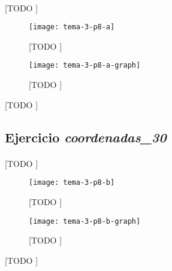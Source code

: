 \documentclass[spanish]{article}
\begin{document}
			\paragraph{}
			[TODO ]

			\begin{figure}[h]
				\begin{center}
					\texttt{[image: tema-3-p8-a]}
				\end{center}
				\caption{[TODO ]}
				\label{}
			\end{figure}

			\begin{figure}[h]
				\begin{center}
					\texttt{[image: tema-3-p8-a-graph]}
				\end{center}
				\caption{[TODO ]}
				\label{}
			\end{figure}

			\begin{table}[h]
				\begin{center}
				\end{center}
				\caption{[TODO ]}
				\label{}
			\end{table}


		\subsection{Ejercicio \emph{coordenadas\_30}}
		\label{sec:e-8b}

			\paragraph{}
			[TODO ]

			\begin{figure}[h]
				\begin{center}
					\texttt{[image: tema-3-p8-b]}
				\end{center}
				\caption{[TODO ]}
				\label{}
			\end{figure}

			\begin{figure}[h]
				\begin{center}
					\texttt{[image: tema-3-p8-b-graph]}
				\end{center}
				\caption{[TODO ]}
				\label{}
			\end{figure}

			\begin{table}[h]
				\begin{center}
				\end{center}
				\caption{[TODO ]}
				\label{}
			\end{table}
\end{document}
